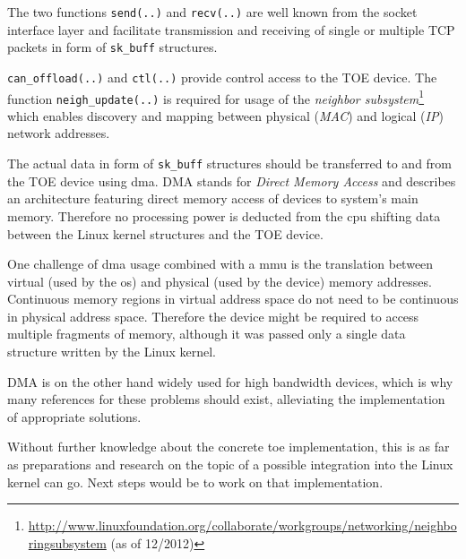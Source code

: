 The two functions \texttt{send(..)} and \texttt{recv(..)} are well known from the socket interface layer and facilitate transmission and receiving of single or multiple TCP packets in form of \texttt{sk\_buff} structures.

\texttt{can\_offload(..)} and \texttt{ctl(..)} provide control access to the TOE device. The function \texttt{neigh\_update(..)} is required for usage of the \textit{neighbor subsystem}\footnote{\url{http://www.linuxfoundation.org/collaborate/workgroups/networking/neighboringsubsystem} (as of 12/2012)} which enables discovery and mapping between physical (\textit{MAC}) and logical (\textit{IP}) network addresses.

The actual data in form of \texttt{sk\_buff} structures should be transferred to and from the TOE device using \gls{dma}. DMA stands for \textit{Direct Memory Access} and describes an architecture featuring direct memory access of devices to system's main memory. Therefore no processing power is deducted from the \gls{cpu} shifting data between the Linux kernel structures and the TOE device.

One challenge of \gls{dma} usage combined with a \gls{mmu} is the translation between virtual (used by the \gls{os}) and physical (used by the device) memory addresses. Continuous memory regions in virtual address space do not need to be continuous in physical address space. Therefore the device might be required to access multiple fragments of memory, although it was passed only a single data structure written by the Linux kernel.

DMA is on the other hand widely used for high bandwidth devices, which is why many references for these problems should exist, alleviating the implementation of appropriate solutions.

Without further knowledge about the concrete \gls{toe} implementation, this is as far as preparations and research on the topic of a possible integration into the Linux kernel can go. Next steps would be to work on that implementation.